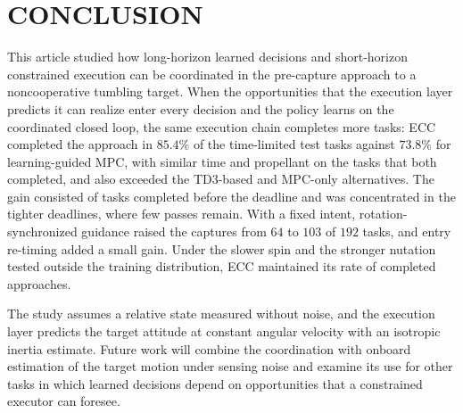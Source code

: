 \section{CONCLUSION}\label{sec:conclusion}

This article studied how long-horizon learned decisions and short-horizon constrained execution can be coordinated in the pre-capture approach to a noncooperative tumbling target. When the opportunities that the execution layer predicts it can realize enter every decision and the policy learns on the coordinated closed loop, the same execution chain completes more tasks: ECC completed the approach in $85.4\%$ of the time-limited test tasks against $73.8\%$ for learning-guided MPC, with similar time and propellant on the tasks that both completed, and also exceeded the TD3-based and MPC-only alternatives. The gain consisted of tasks completed before the deadline and was concentrated in the tighter deadlines, where few passes remain. With a fixed intent, rotation-synchronized guidance raised the captures from $64$ to $103$ of $192$ tasks, and entry re-timing added a small gain. Under the slower spin and the stronger nutation tested outside the training distribution, ECC maintained its rate of completed approaches.

The study assumes a relative state measured without noise, and the execution layer predicts the target attitude at constant angular velocity with an isotropic inertia estimate. Future work will combine the coordination with onboard estimation of the target motion under sensing noise and examine its use for other tasks in which learned decisions depend on opportunities that a constrained executor can foresee.
